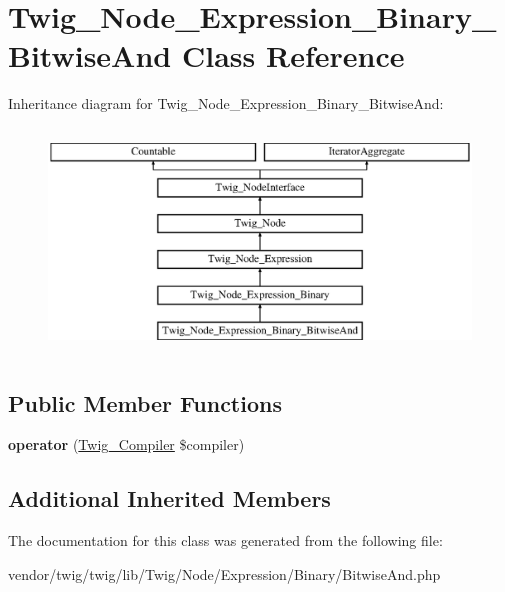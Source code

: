 \hypertarget{classTwig__Node__Expression__Binary__BitwiseAnd}{}\section{Twig\+\_\+\+Node\+\_\+\+Expression\+\_\+\+Binary\+\_\+\+Bitwise\+And Class Reference}
\label{classTwig__Node__Expression__Binary__BitwiseAnd}
Inheritance diagram for Twig\+\_\+\+Node\+\_\+\+Expression\+\_\+\+Binary\+\_\+\+Bitwise\+And\+:\begin{figure}[H]
\begin{center}
\leavevmode
\includegraphics[height=6.000000cm]{classTwig__Node__Expression__Binary__BitwiseAnd}
\end{center}
\end{figure}
\subsection*{Public Member Functions}
\begin{DoxyCompactItemize}
\item 
{\bfseries operator} (\hyperlink{classTwig__Compiler}{Twig\+\_\+\+Compiler} \$compiler)\hypertarget{classTwig__Node__Expression__Binary__BitwiseAnd_a494e3356e013990230e9c9ff3e8a3ade}{}\label{classTwig__Node__Expression__Binary__BitwiseAnd_a494e3356e013990230e9c9ff3e8a3ade}

\end{DoxyCompactItemize}
\subsection*{Additional Inherited Members}


The documentation for this class was generated from the following file\+:\begin{DoxyCompactItemize}
\item 
vendor/twig/twig/lib/\+Twig/\+Node/\+Expression/\+Binary/Bitwise\+And.\+php\end{DoxyCompactItemize}
